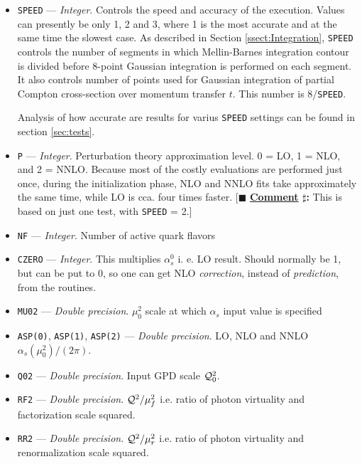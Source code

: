 \documentclass[12pt]{article}
\newcounter{comment}
\newcommand{\comminline}[1]{{%
\refstepcounter{comment}%
\ttfamily\small[$\blacksquare$ \textbf{\underline{Comment}
$\sharp$\thecomment:} #1]}}
\begin{document}
\begin{itemize}
\item
\texttt{SPEED} --- \emph{Integer}. Controls the speed and accuracy of the execution. Values can
presently be only 1, 2 and 3, where 1 is the most accurate and at the
same time the slowest case.
As described in Section \ref{ssect:Integration}, \texttt{SPEED} controls the number
of segments in which Mellin-Barnes integration contour is divided before 8-point
Gaussian integration is performed on each segment. It also controls number of
points used for Gaussian integration of partial Compton cross-section over
momentum transfer $t$. This number is 8/\texttt{SPEED}. 

Analysis of how accurate are results for varius \texttt{SPEED} settings can
be found in section \ref{sec:tests}.

\item
\texttt{P} --- \emph{Integer}. Perturbation theory approximation level. 0 = LO, 1 = NLO, and
  2 = NNLO. Because most of the costly evaluations are performed just once,
  during the initialization phase, NLO and NNLO fits take approximately the
  same time, while LO is cca. four times faster. \comminline{This is based
  on just one test, with \texttt{SPEED} = 2.}

\item
\texttt{NF} --- \emph{Integer}. Number of active quark flavors

\item
\texttt{CZERO} --- \emph{Integer}. This multiplies $\alpha_{s}^{0}$ i. e. LO result.
  Should normally be 1, but can be put to 0, so one can get NLO \emph{correction},
  instead of \emph{prediction}, from the routines.

\item
\texttt{MU02} --- \emph{Double precision}. $\mu_{0}^2$ scale at which
$\alpha_s$ input value is specified

\item
\texttt{ASP(0)}, \texttt{ASP(1)}, \texttt{ASP(2)} --- 
\emph{Double precision}. LO, NLO and NNLO $\alpha_{s}(\mu_{0}^2)/(2\pi)$.

\item
\texttt{Q02} --- \emph{Double precision}. Input GPD scale ${\cal Q}_{0}^2$.

\item
\texttt{RF2} --- \emph{Double precision}. $ {\cal Q}^2/{\mu_{f}^2}$ i.e. ratio
of photon virtuality and factorization scale squared.

\item
\texttt{RR2} --- \emph{Double precision}. $ {\cal Q}^2/{\mu_{r}^2}$ i.e. ratio
of photon virtuality and renormalization scale squared.


\end{itemize}
\end{document}
